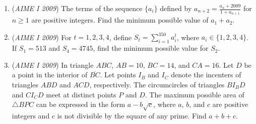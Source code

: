 \begin{enumerate}
 

	\item (\textit{AIME I 2009}) The terms of the sequence $\{a_i\}$ defined by $a_{n + 2} = \frac {a_n + 2009} {1 + a_{n + 1}}$ for $n \ge 1$ are positive integers. Find the minimum possible value of $a_1 + a_2$.


 

	\item (\textit{AIME I 2009}) For $t = 1, 2, 3, 4$, define $S_t = \sum_{i = 1}^{350}a_i^t$, where $a_i \in \{1,2,3,4\}$. If $S_1 = 513$ and $S_4 = 4745$, find the minimum possible value for $S_2$.


 

	\item (\textit{AIME I 2009}) In triangle $ABC$, $AB = 10$, $BC = 14$, and $CA = 16$. Let $D$ be a point in the interior of $\overline{BC}$. Let points $I_B$ and $I_C$ denote the incenters of triangles $ABD$ and $ACD$, respectively. The circumcircles of triangles $BI_BD$ and $CI_CD$ meet at distinct points $P$ and $D$. The maximum possible area of $\triangle BPC$ can be expressed in the form $a - b\sqrt {c}$, where $a$, $b$, and $c$ are positive integers and $c$ is not divisible by the square of any prime. Find $a + b + c$.


 

\end{enumerate}